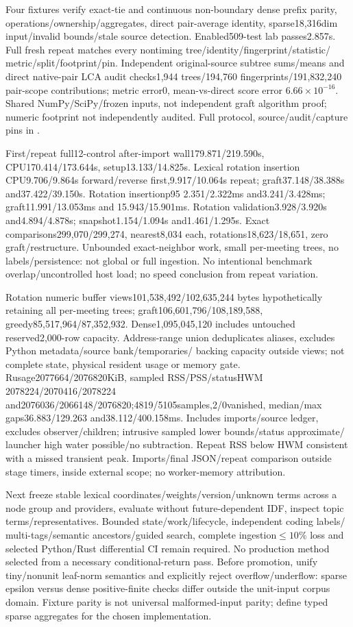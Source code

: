 \documentclass[11pt]{article}
\begin{document}
Four fixtures verify exact-tie and continuous non-boundary dense prefix parity,
operations/ownership/aggregates, direct pair-average identity, sparse18,316dim
input/invalid bounds/stale source detection. Enabled509-test lab passes2.857s.
Full fresh repeat matches every nontiming tree/identity/fingerprint/statistic/
metric/split/footprint/pin. Independent original-source subtree sums/means and
direct native-pair LCA audit checks1,944 trees/194,760 fingerprints/191,832,240
pair-scope contributions; metric error0, mean-vs-direct score error
$6.66\times10^{-16}$. Shared NumPy/SciPy/frozen inputs, not independent graft
algorithm proof; numeric footprint not independently audited. Full protocol,
source/audit/capture pins in
.

First/repeat full12-control after-import wall179.871/219.590s, CPU170.414/173.644s,
setup13.133/14.825s. Lexical rotation insertion CPU9.706/9.864s forward/reverse
first,9.917/10.064s repeat; graft37.148/38.388s and37.422/39.150s.
Rotation insertionp95 2.351/2.322ms and3.241/3.428ms; graft11.991/13.053ms and
15.943/15.901ms. Rotation validation3.928/3.920s and4.894/4.878s;
snapshot1.154/1.094s and1.461/1.295s. Exact comparisons299,070/299,274,
nearest8,034 each, rotations18,623/18,651, zero graft/restructure. Unbounded
exact-neighbor work, small per-meeting trees, no labels/persistence: not global
or full ingestion. No intentional benchmark overlap/uncontrolled host load;
no speed conclusion from repeat variation.

Rotation numeric buffer views101,538,492/102,635,244 bytes hypothetically retaining
all per-meeting trees; graft106,601,796/108,189,588, greedy85,517,964/87,352,932.
Dense1,095,045,120 includes untouched reserved2,000-row capacity. Address-range
union deduplicates aliases, excludes Python metadata/source bank/temporaries/
backing capacity outside views; not complete state, physical resident usage or
memory gate. Rusage2077664/2076820KiB, sampled RSS/PSS/statusHWM
2078224/2070416/2078224 and2076036/2066148/2076820;4819/5105samples,2/0vanished,
median/max gaps36.883/129.263 and38.112/400.158ms. Includes imports/source ledger,
excludes observer/children; intrusive sampled lower bounds/status approximate/
launcher high water possible/no subtraction. Repeat RSS below HWM consistent
with a missed transient peak. Imports/final JSON/repeat comparison outside
stage timers, inside external scope; no worker-memory attribution.

Next freeze stable lexical coordinates/weights/version/unknown terms across a
node group and providers, evaluate without future-dependent IDF, inspect topic
terms/representatives. Bounded state/work/lifecycle, independent coding labels/
multi-tags/semantic ancestors/guided search, complete ingestion$\le10\%$ loss
and selected Python/Rust differential CI remain required. No production method
selected from a necessary conditional-return pass. Before promotion, unify
tiny/nonunit leaf-norm semantics and explicitly reject overflow/underflow: sparse
epsilon versus dense positive-finite checks differ outside the unit-input
corpus domain. Fixture parity is not universal malformed-input parity; define
typed sparse aggregates for the chosen implementation.
\end{document}
